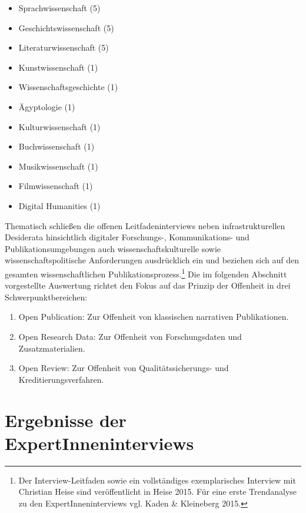 \documentclass[a4paper,
fontsize=11pt,
oneside,
numbers=noperiodatend,
parskip=half-,
bibliography=totoc,
final
]{scrartcl}
\begin{document}
\begin{itemize}
\item
  Sprachwissenschaft (5)
\item
  Geschichtswissenschaft (5)
\item
  Literaturwissenschaft (5)
\item
  Kunstwissenschaft (1)
\item
  Wissenschaftsgeschichte (1)
\item
  Ägyptologie (1)
\item
  Kulturwissenschaft (1)
\item
  Buchwissenschaft (1)
\item
  Musikwissenschaft (1)
\item
  Filmwissenschaft (1)
\item
  Digital Humanities (1)
\end{itemize}

Thematisch schließen die offenen Leitfadeninterviews neben
infrastrukturellen Desiderata hinsichtlich digitaler Forschungs-,
Kommunikations- und Publikationsumgebungen auch wissenschaftskulturelle
sowie wissenschaftspolitische Anforderungen ausdrücklich ein und
beziehen sich auf den gesamten wissenschaftlichen
Publikationsprozess.\footnote{Der Interview-Leitfaden sowie ein
  vollständiges exemplarisches Interview mit Christian Heise sind
  veröffentlicht in Heise 2015. Für eine erste Trendanalyse zu den
  ExpertInneninterviews vgl. Kaden \& Kleineberg 2015.} Die im folgenden
Abschnitt vorgestellte Auswertung richtet den Fokus auf das Prinzip der
Offenheit in drei Schwerpunktbereichen:

\begin{enumerate}
\def\labelenumi{\arabic{enumi}.}
\item
  Open Publication: Zur Offenheit von klassischen narrativen Publikationen.
\item
  Open Research Data: Zur Offenheit von Forschungsdaten und Zusatzmaterialien.
\item
  Open Review: Zur Offenheit von Qualitätssicherungs- und Kreditierungsverfahren.
\end{enumerate}

\section{Ergebnisse der
ExpertInneninterviews}\label{ergebnisse-der-expertinneninterviews}
\end{document}
